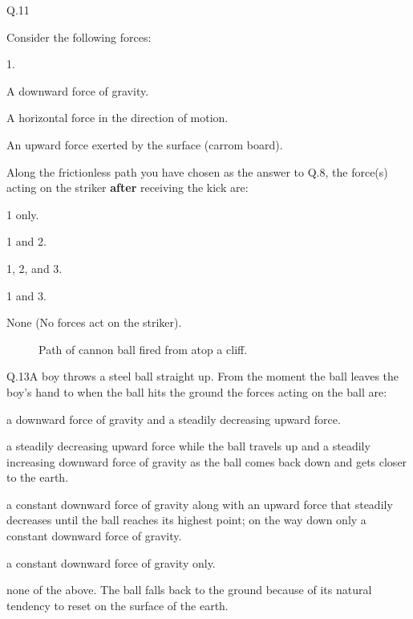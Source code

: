     \begin{mcq}{Q.11}{Consider the following forces:

        \eline[]
        \begin{options}{1.}
            \item A downward force of gravity.
            \item A horizontal force in the direction of motion.
            \item An upward force exerted by the surface (carrom board).
        \end{options}
        \eline[]

        Along the frictionless path you have chosen as the answer to Q.8, the force(s) acting on the striker \textbf{after} receiving the kick are:}
            \item 1 only.
            \item 1 and 2.
            \item 1, 2, and 3.
            \item 1 and 3.
            \item None (No forces act on the striker).
    \end{mcq}


    \begin{figure}[h!]
        \begin{center}
            
            \caption{\label{fig:cannon} Path of cannon ball fired from atop a cliff.\protect\endnotemark}
        \end{center}
    \end{figure}

    \begin{mcq}{Q.13}{A boy throws a steel ball straight up. From the moment the ball leaves the boy's hand to when the ball hits the ground the forces acting on the ball are:}
        \item a downward force of gravity and a steadily decreasing upward force.
        \item a steadily decreasing upward force while the ball travels up and a steadily increasing downward force of gravity as the ball comes back down and gets closer to the earth.
        \item a constant downward force of gravity along with an upward force that steadily decreases until the ball reaches its highest point; on the way down only a constant downward force of gravity.
        \item a constant downward force of gravity only.
        \item none of the above. The ball falls back to the ground because of its natural tendency to reset on the surface of the earth.
    \end{mcq}

